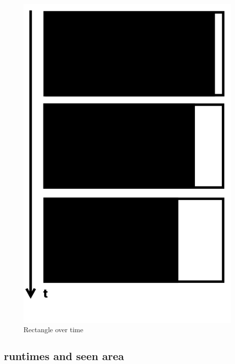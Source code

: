 \documentclass[journal,final,a4paper,twoside]{PS}
\begin{document}
\begin{figure}[h]
\begin{center}
\includegraphics[scale=0.3]{./pics/pattern.png}
\caption{Rectangle over time}
\label{fig:blockOverTime}
\end{center}
\end{figure}

\subsection{runtimes and seen area}
\label{sec:runtime}
\end{document}
